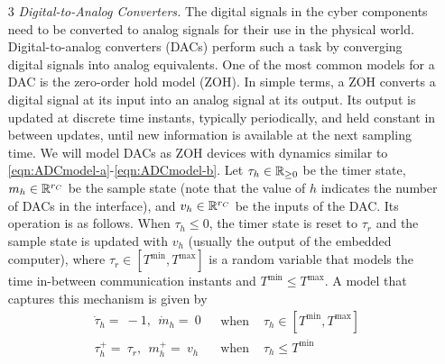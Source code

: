 \documentclass{article}
\begin{document}
\begin{enumerate}
\item[3] {\em Digital-to-Analog Converters.}
The digital signals in the cyber components need to be converted
to analog signals for their use in the physical world.
Digital-to-analog converters (DACs) perform such a task 
by converging digital signals into analog equivalents.
One of the most common models for a DAC
is the zero-order hold model (ZOH). In simple terms, a ZOH converts
a digital signal at its input into an analog signal 
at its output.  
Its output is updated at discrete time instants, typically periodically,
and held constant in between updates, until new information is available at the
next sampling time. We will model DACs as ZOH devices with dynamics
similar to \eqref{eqn:ADCmodel-a}-\eqref{eqn:ADCmodel-b}. Let
$\tau_h\in{{\mathbb R}_{\geq 0}}$ be the timer state, $m_h \in {\mathbb R}^{r_C}$ be the
sample state (note that the value of $h$ indicates the number of DACs
in the interface), and $v_h \in {\mathbb R}^{r_C}$ be the inputs of the DAC.
Its operation is as follows. When $\tau_h \leq 0$, the timer state
is reset to $\tau_r$ and the sample state is updated with $v_h$ (usually
the output of the embedded computer), where $\tau_r\in[T^{\mbox{min}},T^{\mbox{max}}]$ is a random variable that models the time in-between communication instants and $T^{\mbox{min}}\leq T^{\mbox{max}}$.  A model that captures this
mechanism is given by 
\begin{eqnarray}\label{eqn:DACmodel-a}
\left.
\begin{array}{l}
\dot{\tau}_h =\ -1,   \ \
\dot{m}_h  =\ 0
\end{array}
\right. & \mbox{ when }& \tau_h \in [T^{\mbox{min}},T^{\mbox{max}}] \\ \label{eqn:DACmodel-b}
\left.
\begin{array}{ll}
\tau_h^+  =\ \tau_r,  \ \
m_h^+ =\ v_h
\end{array}
\right. & \mbox{ when }& \tau_h \leq T^{\mbox{min}}
\end{eqnarray}
\medskip


\end{enumerate}
\end{document}
